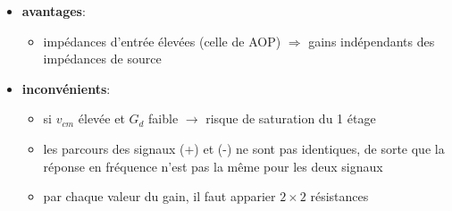 \begin{itemize}
	\item \textbf{avantages}:
	\begin{itemize}
		\item impédances d'entrée élevées (celle de AOP) \(\Rightarrow\) gains indépendants des impédances de source
	\end{itemize} 
	\item \textbf{inconvénients}:
	\begin{itemize}
		\item si \(v_{cm}\) élevée et \(G_d\) faible \(\rightarrow\) risque de saturation du 1 étage
		\item les parcours des signaux (+) et (-) ne sont pas identiques, de sorte que la réponse en fréquence n'est pas la même pour les deux signaux
		\item par chaque valeur du gain, il faut apparier \(2\times 2\) résistances
	\end{itemize}
\end{itemize}
